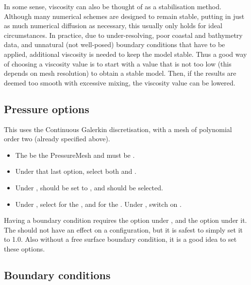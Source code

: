 In some sense, viscosity can also be thought of as a stabilisation method.
Although many numerical schemes are designed to remain stable, putting in just as
much numerical diffusion as necessary, this usually only holds for ideal
circumstances. In practice, due to under-resolving, poor coastal and bathymetry
data, and unnatural (not well-posed) boundary conditions that have to be
applied, additional viscosity is needed to keep the model stable. Thus a good
way of choosing a viscosity value is to start with a value that is not too low
(this depends on mesh resolution) to obtain a stable model. Then, if the results
are deemed too smooth with excessive mixing, the viscosity value can be lowered.

\subsection{Pressure options}
This uses the Continuous Galerkin discretisation, with a mesh of polynomial order two (already specified above).

\begin{itemize}
\item The  be the PressureMesh and  must be .
\item Under that last option, select both 
  and .
\item Under ,  should
  be set to , and 
  should be selected.
\item Under , select  for the
  , and  for the .
  Under , switch on
  .
\end{itemize}

Having a boundary condition  requires the option
 under , 
and the option  under it. The 
should not have an effect on a  configuration, but
it is safest to simply set it to 1.0. Also without a free surface boundary
condition, it is a good idea to set these  options.

\subsection{Boundary conditions}

